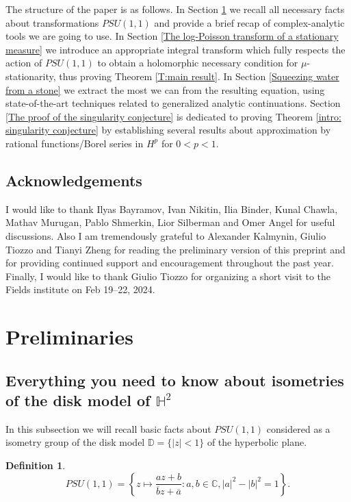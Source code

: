 \documentclass[11pt]{article}
\newtheorem{definition}{Definition}[section]
\begin{document}
The structure of the paper is as follows. In Section \ref{Preliminaries} we recall all necessary facts about transformations $PSU(1,1)$ and provide a brief recap of complex-analytic tools we are going to use. In Section \ref{The log-Poisson transform of a stationary measure} we introduce an appropriate integral transform which fully respects the action of $PSU(1,1)$ to obtain a holomorphic necessary condition for $\mu$-stationarity, thus proving Theorem \ref{T:main result}. In Section \ref{Squeezing water from a stone} we extract the most we can from the resulting equation, using state-of-the-art techniques related to generalized analytic continuations. Section \ref{The proof of the singularity conjecture} is dedicated to proving Theorem \ref{intro: singularity conjecture} by establishing several results about approximation by rational functions/Borel series in $H^p$ for $0 < p < 1$.


\subsection{Acknowledgements}
I would like to thank Ilyas Bayramov, Ivan Nikitin, Ilia Binder, Kunal Chawla, Mathav Murugan, Pablo Shmerkin, Lior Silberman and Omer Angel for useful discussions. Also I am tremendously grateful to Alexander Kalmynin, Giulio Tiozzo and Tianyi Zheng for reading the preliminary version of this preprint and for providing continued support and encouragement throughout the past year. Finally, I would like to thank Giulio Tiozzo for organizing a short visit to the Fields institute on Feb 19--22, 2024. 

\section{Preliminaries}
\label{Preliminaries}
\subsection{Everything you need to know about isometries of the disk model of $\mathbb{H}^2$}
In this subsection we will recall basic facts about $PSU(1,1)$ considered as a isometry group of the disk model $\mathbb{D} = \{ |z| < 1 \}$ of the hyperbolic plane. 
\begin{definition}
	\[
	PSU(1,1) = \left\lbrace z \mapsto \frac{az + b}{\overline{b} z + \overline{a}} : a, b \in \mathbb{C}, |a|^2 - |b|^2 = 1 \right\rbrace.
	\]
\end{definition}
\end{document}
